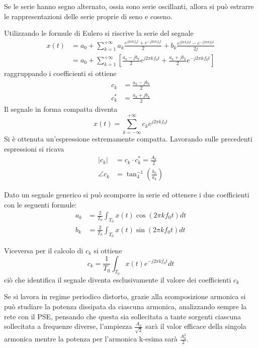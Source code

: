Se le serie hanno segno alternato, ossia sono serie oscillanti, allora si può
estrarre le rappresentazioni delle serie proprie di seno e coseno.

Utilizzando le formule di Eulero si riscrive la serie del segnale
\begin{equation*}\begin{aligned}
 x(t) &= a_0 + \sum_{k=1}^{+\infty} a_k \frac{e^{j2\pi kf_0t} + e^{-j2\pi
kf_0t}}{2} + b_k \frac{e^{j2\pi kf_0t}-e^{-j2\pi kf_0t}}{2j} \\
&=  a_0 + \sum_{k=1}^{+\infty}\left[\frac{a_k-jb_k}{2}e^{j2\pi k f_0 t} +
\frac{a_k+jb_k}{2} e^{-j2\pi kf_0 t} \right]
\end{aligned}\end{equation*}
 raggruppando i coefficienti si ottiene
 $$\begin{aligned}
 c_k &= \frac{a_k-jb_k}{2} \\
 c_k^* &= \frac{a_k+jb_k}{2}
 \end{aligned}$$
Il segnale in forma compatta diventa
 $$
 x(t) = \sum_{k=-\infty}^{+\infty} c_k e^{j2\pi k f_0 t}
 $$
Si è ottenuta un'espressione estremamente compatta.
Lavorando sulle precedenti espressioni si ricava
$$\begin{aligned}
|c_k| &= c_k\cdot c_k^* = \frac{A_k}{2}\\
\angle c_k &= \tan^{-1}_4\left(\frac{b_k}{a_k}\right)
\end{aligned}$$

Dato un segnale generico si può scomporre in serie ed ottenere i due
coefficienti con le seguenti formule:
$$\begin{aligned}
a_k &= \frac{2}{T_0} \int_{T_0} x(t)\cos(2\pi k f_0 t) dt\\
b_k &= \frac{2}{T_0} \int_{T_0} x(t)\sin(2\pi k f_0 t) dt
\end{aligned}$$

Viceversa per il calcolo di $c_k$ si ottiene
$$
c_k = \frac{1}{T_0}\int_{T_0} x(t) e^{-j2\pi k f_0 t}dt
$$
ciò che identifica il segnale diventa esclusivamente il valore dei coefficienti
$c_k$


Se si lavora in regime periodico distorto, grazie alla scomposizione armonica
si può studiare la potenza dissipata da ciascuna armonica, analizzando sempre
la rete con il PSE, pensando che questa sia sollecitata a tante sorgenti
ciascuna sollecitata a frequenze diverse, l'ampiezza $\frac{A_k}{\sqrt2}$ sarà
il valor efficace della singola armonica mentre la potenza per l'armonica
k-esima sarà $\frac{A_k^2}{2}$.

